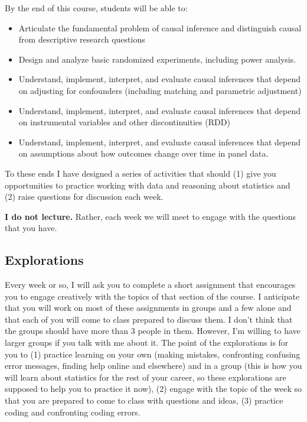 \documentclass[11pt,letterpaper]{article}
\begin{document}
By the end of this course, students will be able to:

\begin{itemize}[leftmargin=*]

  \item Articulate the fundamental problem of causal inference and distinguish
    causal from descriptive research questions

  \item Design and analyze basic randomized experiments, including power
    analysis.

  \item Understand, implement, interpret, and evaluate causal inferences that
    depend on adjusting for confounders (including matching and parametric
    adjustment)

  \item Understand, implement, interpret, and evaluate causal inferences that
    depend on instrumental variables and other discontinuities (RDD)

  \item Understand, implement, interpret, and evaluate causal inferences that
    depend on assumptions about how outcomes change over time in panel data.

\end{itemize}

    To these ends I have designed a series of activities that should (1)
    give you opportunities to practice working with data and reasoning
    about statistics and (2) raise questions for discussion each week.

    \textbf{I do not lecture.} Rather, each week we will meet to engage with the
    questions that you have.

    \subsection*{Explorations}

    Every week or so, I will ask you to complete a short assignment that
    encourages you to engage creatively with the topics of that section of the
    course. I anticipate that you will work on most of these assignments in
    groups and a few alone  and that each of you will come to class prepared to
    discuss them.  I don't think that the groups should have more than 3 people
    in them. However, I'm willing to have larger groups if you talk with me
    about it. The point of the explorations is for you to (1) practice learning
    on your own (making mistakes, confronting confusing error messages, finding
    help online and elsewhere) and in a group (this is how you will learn about
    statistics for the rest of your career, so these explorations are supposed
    to help you to practice it now), (2) engage with the topic of the week so
    that you are prepared to come to class with questions and ideas, (3)
    practice coding and confronting coding errors.
\end{document}
